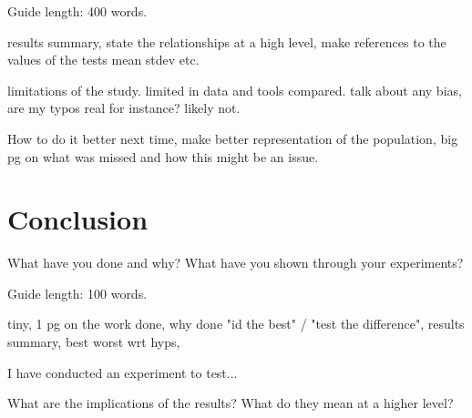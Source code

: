 \documentclass{csfourzero}
\begin{document}
Guide length: 400 words.

results summary, state the relationships at a high level, make references to the values of the tests mean stdev etc.

limitations of the study. limited in data and tools compared. talk about any bias, are my typos real for instance? likely not.

How to do it better next time, make better representation of the population, big pg on what was missed and how this might be an issue.

\section{Conclusion}
\label{sec:conc}

What have you done and why? What have you shown through your
experiments?

Guide length: 100 words.

tiny, 1 pg on the work done, why done "id the best" / "test the difference", results summary, best worst wrt hyps,

I have conducted an experiment to test...

What are the implications of the results? What do they mean at a higher level?


\end{document}
